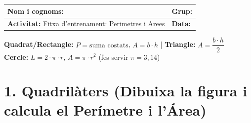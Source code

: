 \documentclass[12pt,a4paper]{article}
\begin{document}
\begingroup
\renewcommand{\arraystretch}{2.2}
\begin{tabularx}{\textwidth}{|X|p{4cm}|}
    \hline
    \textbf{Nom i cognoms:} & \textbf{Grup:} \\ \hline
    \textbf{Activitat:} Fitxa d'entrenament: Perimetres i Arees & \textbf{Data:} \\ \hline
\end{tabularx}
\endgroup

\vspace{0.4cm}

\begin{tcolorbox}[colback=yellow!5, colframe=yellow!70!black, title=Recordatori rapid]
\small
\textbf{Quadrat/Rectangle:} $P = \text{suma costats}$,\; $A = b \cdot h$
\quad|\quad
\textbf{Triangle:} $A = \dfrac{b \cdot h}{2}$ \\[4pt]
\textbf{Cercle:} $L = 2 \cdot \pi \cdot r$,\; $A = \pi \cdot r^2$
\quad (fes servir $\pi = 3{,}14$)
\end{tcolorbox}

\vspace{0.4cm}

\section*{1. Quadril\`aters \normalfont\small(Dibuixa la figura i calcula el Per\'imetre i l'\'Area)}
\end{document}
